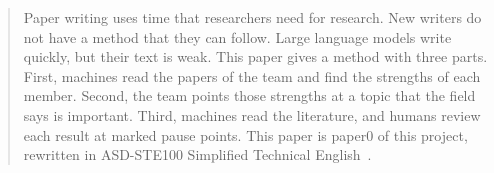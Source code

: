 \begin{abstract}
Paper writing uses time that researchers need for research.
New writers do not have a method that they can follow.
Large language models write quickly, but their text is weak.
This paper gives a method with three parts.
First, machines read the papers of the team and find the strengths of
each member.
Second, the team points those strengths at a topic that the field says
is important.
Third, machines read the literature, and humans review each result at
marked pause points.
This paper is paper0 of this project, rewritten in ASD-STE100
Simplified Technical English~\cite{asdste25}.
\end{abstract}
